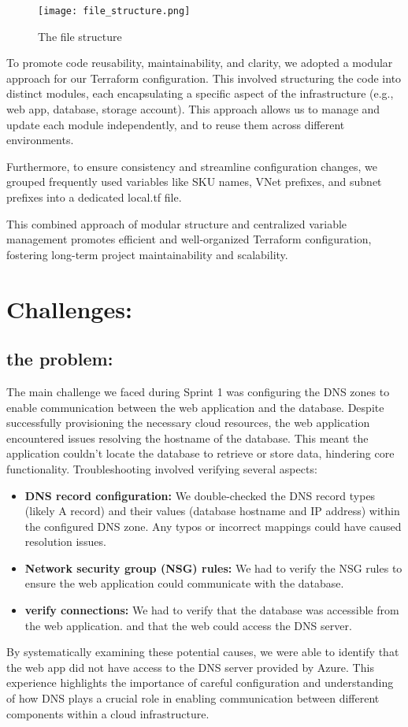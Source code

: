 \begin{figure}[htpb]
    \centering
    \texttt{[image: file\_structure.png]}
    \caption{The file structure}
    \label{fig:file_structure}
\end{figure}
To promote code reusability, maintainability, and clarity, we adopted a modular approach for our Terraform configuration. This involved structuring the code into distinct modules, each encapsulating a specific aspect of the infrastructure (e.g., web app, database, storage account). This approach allows us to manage and update each module independently, and to reuse them across different environments.
\par
Furthermore, to ensure consistency and streamline configuration changes, we grouped frequently used variables like SKU names, VNet prefixes, and subnet prefixes into a dedicated local.tf file.
\par
This combined approach of modular structure and centralized variable management promotes efficient and well-organized Terraform configuration, fostering long-term project maintainability and scalability.
\section{Challenges:}
\subsection*{the problem:}
The main challenge we faced during Sprint 1 was configuring the DNS zones to enable communication between the web application and the database. Despite successfully provisioning the necessary cloud resources, the web application encountered issues resolving the hostname of the database. This meant the application couldn't locate the database to retrieve or store data, hindering core functionality. Troubleshooting involved verifying several aspects:
\begin{itemize}
    \item \textbf{DNS record configuration:} We double-checked the DNS record types (likely A record) and their values (database hostname and IP address) within the configured DNS zone. Any typos or incorrect mappings could have caused resolution issues.
    \item \textbf{Network security group (NSG) rules:} We had to verify the NSG rules to ensure the web application could communicate with the database.
    \item \textbf{verify connections:} We had to verify that the database was accessible from the web application. and that the web could access the DNS server.
\end{itemize}
By systematically examining these potential causes, we were able to identify that the web app did not have access to the DNS server provided by Azure. This experience highlights the importance of careful configuration and understanding of how DNS plays a crucial role in enabling communication between different components within a cloud infrastructure.
